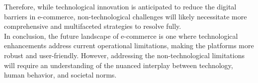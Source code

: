 \documentclass[12pt,a4paper]{article}
\begin{document}
\noindent Therefore, while technological innovation is anticipated to reduce the digital barriers in e-commerce, non-technological challenges will likely necessitate more comprehensive and multifaceted strategies to resolve fully. \\

\noindent In conclusion, the future landscape of e-commerce is one where technological enhancements address current operational limitations, making the platforms more robust and user-friendly. However, addressing the non-technological limitations will require an understanding of the nuanced interplay between technology, human behavior, and societal norms. 

\pagebreak
 



	
\def\UrlBreaks{\do\/\do-}

\clearpage
\end{document}
